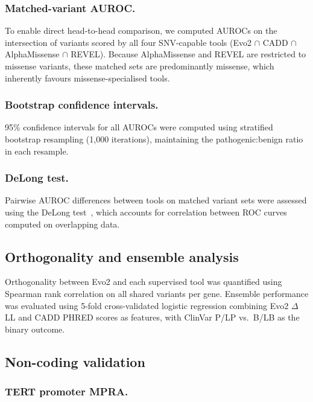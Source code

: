 \subsubsection*{Matched-variant AUROC.}

To enable direct head-to-head comparison, we computed AUROCs on the intersection
of variants scored by all four SNV-capable tools (Evo2 $\cap$ CADD $\cap$
AlphaMissense $\cap$ REVEL). Because AlphaMissense and REVEL are restricted to
missense variants, these matched sets are predominantly missense, which
inherently favours missense-specialised tools.

\subsubsection*{Bootstrap confidence intervals.}

95\% confidence intervals for all AUROCs were computed using stratified bootstrap
resampling (1,000 iterations), maintaining the pathogenic:benign ratio in each
resample.

\subsubsection*{DeLong test.}

Pairwise AUROC differences between tools on matched variant sets were assessed
using the DeLong test~\cite{DeLong_1988}, which accounts for correlation between
ROC curves computed on overlapping data.

\subsection{Orthogonality and ensemble analysis}
\label{sec:methods_ensemble}

Orthogonality between Evo2 and each supervised tool was quantified using Spearman
rank correlation on all shared variants per gene. Ensemble performance was
evaluated using 5-fold cross-validated logistic regression combining Evo2
$\Delta$LL and CADD PHRED scores as features, with ClinVar P/LP vs.\ B/LB as
the binary outcome.

\subsection{Non-coding validation}
\label{sec:methods_noncoding}

\subsubsection*{TERT promoter MPRA.}

